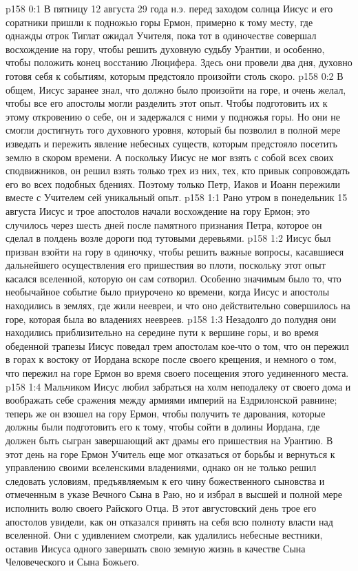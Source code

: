 \author{Комиссия срединников}
\vs p158 0:1 В пятницу 12 августа 29 года н.э. перед заходом солнца Иисус и его соратники пришли к подножью горы Ермон, примерно к тому месту, где однажды отрок Тиглат ожидал Учителя, пока тот в одиночестве совершал восхождение на гору, чтобы решить духовную судьбу Урантии, и особенно, чтобы положить конец восстанию Люцифера. Здесь они провели два дня, духовно готовя себя к событиям, которым предстояло произойти столь скоро.
\vs p158 0:2 В общем, Иисус заранее знал, что должно было произойти на горе, и очень желал, чтобы все его апостолы могли разделить этот опыт. Чтобы подготовить их к этому откровению о себе, он и задержался с ними у подножья горы. Но они не смогли достигнуть того духовного уровня, который бы позволил в полной мере изведать и пережить явление небесных существ, которым предстояло посетить землю в скором времени. А поскольку Иисус не мог взять с собой всех своих сподвижников, он решил взять только трех из них, тех, кто привык сопровождать его во всех подобных бдениях. Поэтому только Петр, Иаков и Иоанн пережили вместе с Учителем сей уникальный опыт.
\vs p158 1:1 Рано утром в понедельник 15 августа Иисус и трое апостолов начали восхождение на гору Ермон; это случилось через шесть дней после памятного признания Петра, которое он сделал в полдень возле дороги под тутовыми деревьями.
\vs p158 1:2 Иисус был призван взойти на гору в одиночку, чтобы решить важные вопросы, касавшиеся дальнейшего осуществления его пришествия во плоти, поскольку этот опыт касался вселенной, которую он сам сотворил. Особенно значимым было то, что необычайное событие было приурочено ко времени, когда Иисус и апостолы находились в землях, где жили неевреи, и что оно действительно совершилось на горе, которая была во владениях неевреев.
\vs p158 1:3 Незадолго до полудня они находились приблизительно на середине пути к вершине горы, и во время обеденной трапезы Иисус поведал трем апостолам кое\hyp{}что о том, что он пережил в горах к востоку от Иордана вскоре после своего крещения, и немного о том, что пережил на горе Ермон во время своего посещения этого уединенного места.
\vs p158 1:4 Мальчиком Иисус любил забраться на холм неподалеку от своего дома и воображать себе сражения между армиями империй на Ездрилонской равнине; теперь же он взошел на гору Ермон, чтобы получить те дарования, которые должны были подготовить его к тому, чтобы сойти в долины Иордана, где должен быть сыгран завершающий акт драмы его пришествия на Урантию. В этот день на горе Ермон Учитель еще мог отказаться от борьбы и вернуться к управлению своими вселенскими владениями, однако он не только решил следовать условиям, предъявляемым к его чину божественного сыновства и отмеченным в указе Вечного Сына в Раю, но и избрал в высшей и полной мере исполнить волю своего Райского Отца. В этот августовский день трое его апостолов увидели, как он отказался принять на себя всю полноту власти над вселенной. Они с удивлением смотрели, как удалились небесные вестники, оставив Иисуса одного завершать свою земную жизнь в качестве Сына Человеческого и Сына Божьего.
